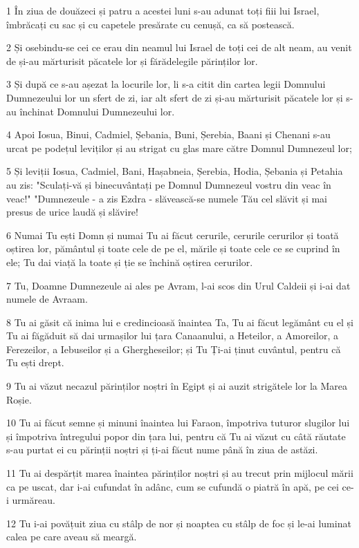 \par 1 În ziua de douăzeci și patru a acestei luni s-au adunat toți fiii lui Israel, îmbrăcați cu sac și cu capetele presărate cu cenușă, ca să postească.
\par 2 Și osebindu-se cei ce erau din neamul lui Israel de toți cei de alt neam, au venit de și-au mărturisit păcatele lor și fărădelegile părinților lor.
\par 3 Și după ce s-au așezat la locurile lor, li s-a citit din cartea legii Domnului Dumnezeului lor un sfert de zi, iar alt sfert de zi și-au mărturisit păcatele lor și s-au închinat Domnului Dumnezeului lor.
\par 4 Apoi Iosua, Binui, Cadmiel, Șebania, Buni, Șerebia, Baani și Chenani s-au urcat pe podețul leviților și au strigat cu glas mare către Domnul Dumnezeul lor;
\par 5 Și leviții Iosua, Cadmiel, Bani, Hașabneia, Șerebia, Hodia, Șebania și Petahia au zis: "Sculați-vă și binecuvântați pe Domnul Dumnezeul vostru din veac în veac!" "Dumnezeule - a zis Ezdra - slăvească-se numele Tău cel slăvit și mai presus de urice laudă și slăvire!
\par 6 Numai Tu ești Domn și numai Tu ai făcut cerurile, cerurile cerurilor și toată oștirea lor, pământul și toate cele de pe el, mările și toate cele ce se cuprind în ele; Tu dai viață la toate și ție se închină oștirea cerurilor.
\par 7 Tu, Doamne Dumnezeule ai ales pe Avram, l-ai scos din Urul Caldeii și i-ai dat numele de Avraam.
\par 8 Tu ai găsit că inima lui e credincioasă înaintea Ta, Tu ai făcut legământ cu el și Tu ai făgăduit să dai urmașilor lui țara Canaanului, a Heteilor, a Amoreilor, a Ferezeilor, a Iebuseilor și a Ghergheseilor; și Tu Ți-ai ținut cuvântul, pentru că Tu ești drept.
\par 9 Tu ai văzut necazul părinților noștri în Egipt și ai auzit strigătele lor la Marea Roșie.
\par 10 Tu ai făcut semne și minuni înaintea lui Faraon, împotriva tuturor slugilor lui și împotriva întregului popor din țara lui, pentru că Tu ai văzut cu câtă răutate s-au purtat ei cu părinții noștri și ți-ai făcut nume până în ziua de astăzi.
\par 11 Tu ai despărțit marea înaintea părinților noștri și au trecut prin mijlocul mării ca pe uscat, dar i-ai cufundat în adânc, cum se cufundă o piatră în apă, pe cei ce-i urmăreau.
\par 12 Tu i-ai povățuit ziua cu stâlp de nor și noaptea cu stâlp de foc și le-ai luminat calea pe care aveau să meargă.
